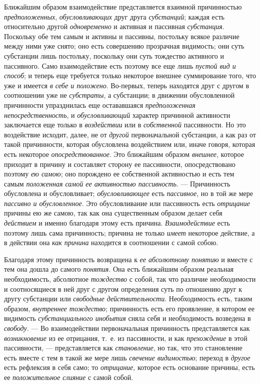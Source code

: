 Ближайшим образом взаимодействие представляется взаимной причинностью
{\em предположенных},
{\em обусловливающих} друг друга
{\em субстанций}; каждая есть относительно другой
{\em одновременно} и активная и пассивная
{\em субстанция}. Поскольку обе тем самым и активны и
пассивны, постольку всякое различие между ними уже снято; оно есть
совершению прозрачная видимость; они суть субстанции лишь постольку,
поскольку они суть тождество активного и пассивного. Само взаимодействие
есть поэтому все еще лишь {\em пустой вид и способ}; и
теперь еще требуется только некоторое внешнее суммирование того, что уже и
имеется {\em в себе и положено}. Во-первых, теперь
находятся друг с другом в соотношении уже не
{\em субстраты}, а субстанции; в движении обусловленной
причинности упразднилась еще остававшаяся
{\em предположенная непосредственность}, и
{\em обусловливающий} характер причинной активности
заключается еще только в {\em воздействии} или в
{\em собственной} пассивности. Но это воздействие
исходит, далее, не от {\em другой} первоначальной
субстанции, а как раз от такой причинности, которая обусловлена
воздействием или, иначе говоря, которая есть некоторое
{\em опосредствованное}. Это ближайшим образом
{\em внешнее}, которое приходит в причину и составляет
сторону ее пассивности, опосредствовано поэтому {\em ею
самою}; оно порождено ее собственной активностью и есть тем самым
{\em положенная самой ее активностью пассивность}. —
Причинность обусловлена и обусловливает;
{\em обусловливающее} есть
{\em пассивное}, но в той же мере
{\em пассивно и обусловленное}. Это обусловливание или
пассивность есть {\em отрицание} причины ею же самою,
так как она существенным образом делает себя
{\em действием} и именно благодаря этому есть причина.
{\em Взаимодействие} есть поэтому лишь сама
причинность; причина не только {\em имеет} некоторое
действие, а в действии она {\em как причина} находится
в соотношении с самой собою.

Благодаря этому причинность возвращена к {\em ее
абсолютному понятию} и вместе с тем она дошла до самого
{\em понятия}. Она есть ближайшим образом реальная
необходимость, абсолютное {\em тождество} с собой, так
что различие необходимости и соотносящиеся в ней друг с другом определения
суть по отношению друг к другу субстанции или
{\em свободные действительности}. Необходимость есть,
таким образом, {\em внутреннее тождество}; причинность
есть его проявление, в котором ее видимость
{\em субстанциального инобытия} сняла себя и
необходимость возведена в {\em свободу}. — Во
взаимодействии первоначальная причинность представляется как
{\em возникновение} из ее отрицания, т.~е. из
пассивности, и как {\em прехождение} в этой
пассивности, — представляется как {\em становление}, но
так, что это становление есть вместе с тем в такой же мере лишь
{\em свечение видимостью}; переход в
{\em другое} есть рефлексия в себя само; то
{\em отрицание}, которое есть основание причины, есть
ее {\em положительное слияние} с самой собой.

